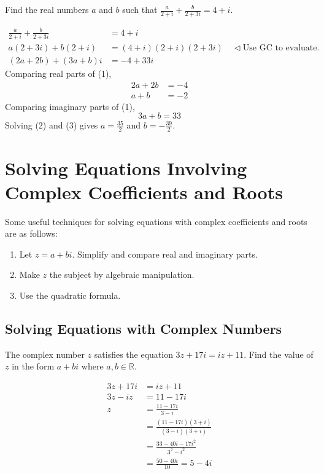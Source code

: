 \documentclass[11pt,a4paper]{book}
\newcommand{\R}{\mathbb{R}}
\begin{document}
\begin{example}

Find the real numbers $a$ and $b$ such that ${\displaystyle \frac{a}{2+i}+\frac{b}{2+3i}=4+i}$.

\Solution

\begin{align*}
\frac{a}{2+i}+\frac{b}{2+3i} & =4+i\\
a\left(2+3i\right)+b\left(2+i\right) & =\left(4+i\right)\left(2+i\right)\left(2+3i\right)\quad\triangleleft\text{Use GC to evaluate.}\\
\left(2a+2b\right)+\left(3a+b\right)i & =-4+33i\tag{1}
\end{align*}
Comparing real parts of (1),
\begin{align*}
2a+2b & =-4\\
a+b & =-2\tag{2}
\end{align*}
Comparing imaginary parts of (1),
\[
3a+b=33\tag{3}
\]
Solving (2) and (3) gives ${\displaystyle a=\frac{35}{2}}$ and ${\displaystyle b=-\frac{39}{2}}$.

\end{example}

\newpage

\section{Solving Equations Involving Complex Coefficients and Roots}
Some useful techniques for solving equations with complex coefficients and roots are as follows:
\begin{enumerate}
\item Let $z=a+bi$. Simplify and compare real and imaginary parts.
\item Make $z$ the subject by algebraic manipulation.
\item Use the quadratic formula.
\end{enumerate}
\subsection{Solving Equations with Complex Numbers }

\begin{example}

The complex number $z$ satisfies the equation $3z+17i=iz+11$. Find the value of $z$ in the form $a+bi$ where $a,b\in\R$.

\Solution

\begin{align*}
3z+17i & =iz+11\\
3z-iz & =11-17i\\
z & =\frac{11-17i}{3-i}\\
 & =\frac{\left(11-17i\right)\left(3+i\right)}{\left(3-i\right)\left(3+i\right)}\\
 & =\frac{33-40i-17i^{2}}{3^{2}-i^{2}}\\
 & =\frac{50-40i}{10}=5-4i
\end{align*}

\end{example}
\end{document}

